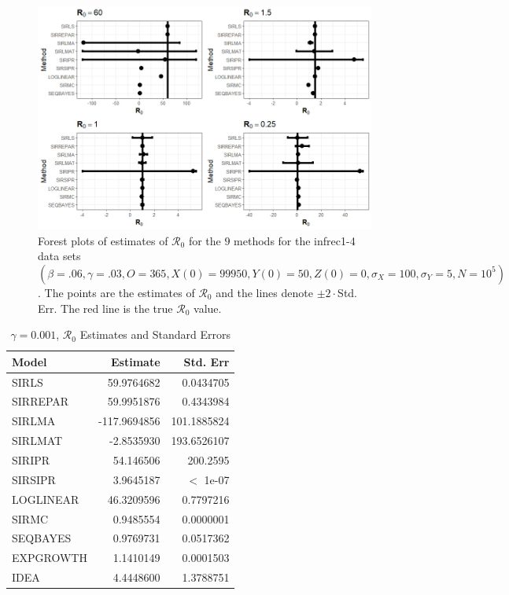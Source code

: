 \documentclass[12pt]{article}
\newcommand{\xxsir}{\ensuremath{9} } %
\newcommand{\rr}{\ensuremath{\mathcal{R}_0}}
\begin{document}
\begin{figure}[H]
  \centering
  \includegraphics[scale=0.5]{images/parchange.jpeg}
  \caption{Forest plots of estimates of $\rr$ for the \xxsir methods for the infrec1-4 data sets $(\beta=.06, \gamma=.03, O=365, X(0)=99950, Y(0)=50, Z(0)=0, \sigma_X=100, \sigma_Y=5, N=10^5)$.  The points are the estimates of $\rr$ and the lines denote $\pm 2\cdot $Std. Err.  The red line is the true $\rr$ value.}
  \label{fig:infrec1-res}
\end{figure}
\begin{table}[H]

	\centering
	\begin{tabular}[t]{l|r|r}
		\hline
		Model & Estimate & Std. Err\\
		\hline
		SIRLS & 59.9764682 & 0.0434705\\
		\hline
		SIRREPAR & 59.9951876 & 0.4343984\\
		\hline
		SIRLMA &  -117.9694856 & 101.1885824\\
		\hline
		SIRLMAT & -2.8535930 & 193.6526107 \\
		\hline
		SIRIPR & 54.146506 & 200.2595\\
		\hline
		SIRSIPR & 3.9645187 & $<$ 1e-07\\
		\hline
		LOGLINEAR & 46.3209596 & 0.7797216\\
		\hline
		SIRMC & 0.9485554 & 0.0000001\\
		\hline
		SEQBAYES & 0.9769731 & 0.0517362\\
		\hline
		EXPGROWTH & 1.1410149 & 0.0001503\\
		\hline
		IDEA & 4.4448600 & 1.3788751\\
		\hline
	\end{tabular}
        \caption{\label{tab:infrec1-res}$\gamma = 0.001$, $\rr$ Estimates and Standard Errors}
\end{table}
\end{document}
